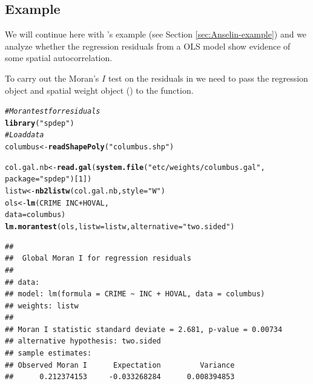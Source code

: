 \documentclass[english,12pt]{book}\usepackage[]{graphicx}\usepackage[]{xcolor}
\makeatletter
\newcommand{\hlnum}[1]{\textcolor[rgb]{0.686,0.059,0.569}{#1}}%
\newcommand{\hlsng}[1]{\textcolor[rgb]{0.192,0.494,0.8}{#1}}%
\newcommand{\hlcom}[1]{\textcolor[rgb]{0.678,0.584,0.686}{\textit{#1}}}%
\newcommand{\hlopt}[1]{\textcolor[rgb]{0,0,0}{#1}}%
\newcommand{\hldef}[1]{\textcolor[rgb]{0.345,0.345,0.345}{#1}}%
\newcommand{\hlkwb}[1]{\textcolor[rgb]{0.69,0.353,0.396}{#1}}%
\newcommand{\hlkwc}[1]{\textcolor[rgb]{0.333,0.667,0.333}{#1}}%
\newcommand{\hlkwd}[1]{\textcolor[rgb]{0.737,0.353,0.396}{\textbf{#1}}}%
\newenvironment{kframe}{%
 \def\at@end@of@kframe{}%
 \ifinner\ifhmode%
  \def\at@end@of@kframe{\end{minipage}}%
  \begin{minipage}{\columnwidth}%
 \fi\fi%
 \def\FrameCommand##1{\hskip\@totalleftmargin \hskip-\fboxsep
 \colorbox{shadecolor}{##1}\hskip-\fboxsep
     \hskip-\linewidth \hskip-\@totalleftmargin \hskip\columnwidth}%
 \MakeFramed {\advance\hsize-\width
   \@totalleftmargin\z@ \linewidth\hsize
   \@setminipage}}%
 {\par\unskip\endMakeFramed%
 \at@end@of@kframe}
\newenvironment{knitrout}{}{} %
\makeatother
\begin{document}
\subsection{Example}

We will continue here with \cite{anselin1988spatial}'s example (see Section \ref{sec:Anselin-example}) and we analyze whether the regression residuals from a OLS model show evidence of some spatial autocorrelation. 

To carry out the Moran's $I$ test on the residuals in  we need to pass the regression object and spatial weight object () to the  function. 

\begin{knitrout}
\color{fgcolor}\begin{kframe}
\begin{alltt}
\hlcom{# Moran test for residuals}
\hlkwd{library}\hldef{(}\hlsng{"spdep"}\hldef{)}
\hlcom{# Load data}
\hldef{columbus}   \hlkwb{<-} \hlkwd{readShapePoly}\hldef{(}\hlsng{"columbus.shp"}\hldef{)}
\end{alltt}


{\ttfamily\noindent\bfseries{}}\begin{alltt}
\hldef{col.gal.nb} \hlkwb{<-} \hlkwd{read.gal}\hldef{(}\hlkwd{system.file}\hldef{(}\hlsng{"etc/weights/columbus.gal"}\hldef{,}
                                   \hlkwc{package} \hldef{=} \hlsng{"spdep"}\hldef{)[}\hlnum{1}\hldef{])}
\hldef{listw} \hlkwb{<-} \hlkwd{nb2listw}\hldef{(col.gal.nb,} \hlkwc{style} \hldef{=} \hlsng{"W"}\hldef{)}
\hldef{ols} \hlkwb{<-} \hlkwd{lm}\hldef{(CRIME} \hlopt{~} \hldef{INC} \hlopt{+} \hldef{HOVAL,}
          \hlkwc{data} \hldef{=  columbus)}
\hlkwd{lm.morantest}\hldef{(ols,} \hlkwc{listw} \hldef{= listw,} \hlkwc{alternative} \hldef{=} \hlsng{"two.sided"}\hldef{)}
\end{alltt}
\begin{verbatim}
## 
## 	Global Moran I for regression residuals
## 
## data:  
## model: lm(formula = CRIME ~ INC + HOVAL, data = columbus)
## weights: listw
## 
## Moran I statistic standard deviate = 2.681, p-value = 0.00734
## alternative hypothesis: two.sided
## sample estimates:
## Observed Moran I      Expectation         Variance 
##      0.212374153     -0.033268284      0.008394853
\end{verbatim}
\end{kframe}
\end{knitrout}
\end{document}
